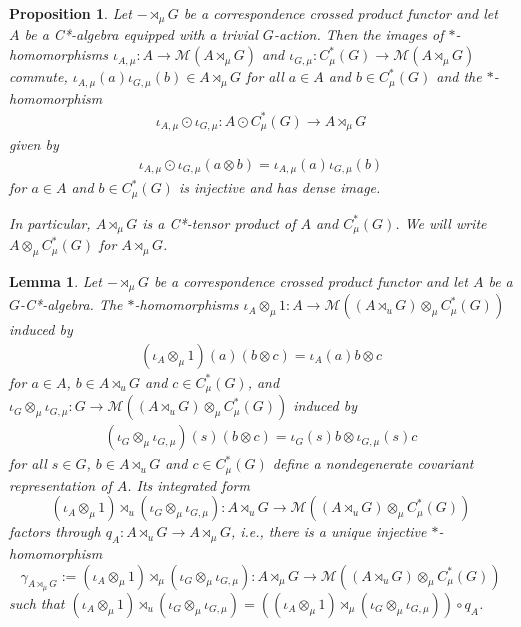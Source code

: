 \documentclass[12pt]{amsart}
\newtheorem{lem}[thm]{Lemma}
\newtheorem{prop}[thm]{Proposition}
\theoremstyle{definition}
\theoremstyle{remark}
\numberwithin{equation}{section}
\begin{document}
\begin{prop}\label{prop:triv}
	Let $-\rtimes_\mu G$ be a correspondence crossed product functor and let $A$ be a C*-algebra equipped with a trivial $G$-action. Then the images of $*$-homomorphisms
	$\iota_{A,\mu}\colon A\to \mathcal{M}(A\rtimes_\mu G)$ and
	$\iota_{G,\mu}\colon C_\mu^*(G) \to \mathcal{M}(A\rtimes_\mu G)$ commute,
	$\iota_{A,\mu}(a)\iota_{G,\mu}(b) \in A\rtimes_\mu G$ for all
	$a\in A$ and $b\in C^*_\mu(G)$ and the $*$-homomorphism
	\begin{align*}
		\iota_{A,\mu}\odot \iota_{G,\mu}\colon A\odot C_\mu^*(G) \to A\rtimes_\mu G
	\end{align*}
	given by
	\begin{align*}
		\iota_{A,\mu}\odot \iota_{G,\mu}(a\otimes b) =\iota_{A,\mu}(a)\iota_{G,\mu}(b)
	\end{align*}
	for $a\in A$ and $b\in C_\mu^*(G)$ is injective and has dense image.
	
	In particular, $A\rtimes_\mu G$ is a C*-tensor product of $A$ and $C^*_\mu(G)$.
	We will write $A\otimes_\mu C^*_\mu(G)$ for $A\rtimes_\mu G$.
\end{prop}


\begin{lem}\label{lem:strong_fell_absorption}
		Let $-\rtimes_\mu G$ be a correspondence crossed product functor and let $A$ be a $G$-C*-algebra.
		The $*$-homomorphisms
		 $\iota_A \otimes_\mu 1\colon A \to \mathcal{M}((A\rtimes_{u} G) \otimes_\mu C_\mu^* (G))$
		induced by
		\begin{align*}
			(\iota_A \otimes_\mu 1)(a) (b\otimes c) = \iota_A(a)b \otimes c
		\end{align*}
		for $a\in A$, $b\in A\rtimes_{u} G$ and $c\in C^*_\mu (G)$,
		and
		$\iota_G \otimes_\mu \iota_{G,\mu}\colon G \to \mathcal{M}((A\rtimes_{u} G) \otimes_\mu C_\mu^* (G))$
		induced by
		\begin{align*}
			(\iota_G \otimes_\mu \iota_{G,\mu})(s) (b\otimes c) = \iota_G(s)b \otimes \iota_{G,\mu}(s) c
		\end{align*}
		for all $s\in G$, $b\in A\rtimes_{u} G$ and $c\in C_\mu^* (G)$
		define a nondegenerate covariant representation of $A$. Its integrated form
		\[(\iota_A \otimes_\mu 1) \rtimes_{u} (\iota_G \otimes_\mu \iota_{G,\mu}) \colon A\rtimes_{u} G \to \mathcal{M}((A\rtimes_{u} G) \otimes_\mu C_\mu^* (G) )\]
		factors through
		$q_A \colon A\rtimes_{u} G \to A\rtimes_\mu G$, i.e., there is a unique injective $*$-homomorphism
		\[\gamma_{A\rtimes_\mu G}:=(\iota_A \otimes_\mu 1) \rtimes_\mu (\iota_G \otimes_\mu \iota_{G,\mu})\colon A\rtimes_\mu G
		\to \mathcal{M}((A\rtimes_{u} G) \otimes_\mu C_\mu^* (G))\]
		such that $(\iota_A \otimes_\mu 1) \rtimes_{u} (\iota_G \otimes_\mu \iota_{G,\mu})
		= ((\iota_A \otimes_\mu 1) \rtimes_\mu (\iota_G \otimes_\mu \iota_{G,\mu})) \circ q_A$.
	\end{lem}
\end{document}
